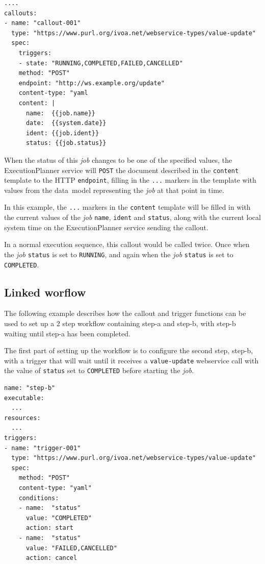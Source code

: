 \documentclass[11pt,a4paper]{ivoa}
\newcommand{\datamodel} {data~model}
\newcommand{\webservice} {webservice}
\newcommand{\execplanner} {ExecutionPlanner}
\newcommand{\codeword}[1] {\texttt{#1}}
\newcommand{\job} {\textit{job}}
\begin{document}
\begin{lstlisting}[]
....
callouts:
- name: "callout-001"
  type: "https://www.purl.org/ivoa.net/webservice-types/value-update"
  spec:
    triggers:
    - state: "RUNNING,COMPLETED,FAILED,CANCELLED"
    method: "POST"
    endpoint: "http://ws.example.org/update"
    content-type: "yaml
    content: |
      name:  {{job.name}}
      date:  {{system.date}}
      ident: {{job.ident}}
      status: {{job.status}}
\end{lstlisting}

When the status of this \job{} changes to be one of the specified values, the
\execplanner{} service will \codeword{POST} the document described in the
\codeword{content} template to the HTTP \codeword{endpoint}, filling in the \codeword{{{...}}}
markers in the template with values from the \datamodel{} representing the \job{}
at that point in time.

In this example, the \codeword{{{...}}} markers in the \codeword{content} template will be filled
in with the current values of the \job{} \codeword{name}, \codeword{ident} and \codeword{status},
along with the current local system time on the \execplanner{} service sending the callout.

In a normal execution sequence, this callout would be called twice. Once when the \job{} \codeword{status}
is set to \codeword{RUNNING}, and again when the \job{} \codeword{status} is set to \codeword{COMPLETED}.

\subsection{Linked worflow}
\label{linked-worflow}

The following example describes how the callout and trigger functions can be used to
set up a 2 step workflow containing step-a and step-b, with step-b waiting until
step-a has been completed.

The first part of setting up the workflow is to configure the second step, step-b, with a trigger that
will wait until it receives a \codeword{value-update} \webservice{} call with the
value of \codeword{status} set to \codeword{COMPLETED} before starting the \job{}.

\begin{lstlisting}[]
name: "step-b"
executable:
  ...
resources:
  ...
triggers:
- name: "trigger-001"
  type: "https://www.purl.org/ivoa.net/webservice-types/value-update"
  spec:
    method: "POST"
    content-type: "yaml"
    conditions:
    - name:  "status"
      value: "COMPLETED"
      action: start
    - name:  "status"
      value: "FAILED,CANCELLED"
      action: cancel
\end{lstlisting}
\end{document}
